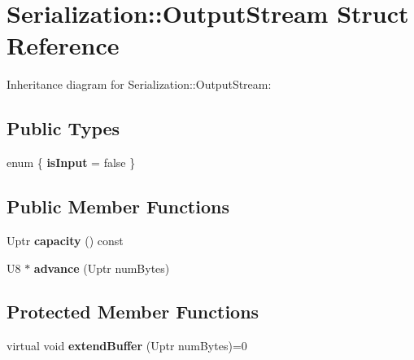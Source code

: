 \hypertarget{struct_serialization_1_1_output_stream}{}\section{Serialization\+:\+:Output\+Stream Struct Reference}
\label{struct_serialization_1_1_output_stream}


Inheritance diagram for Serialization\+:\+:Output\+Stream\+:
\subsection*{Public Types}
\begin{DoxyCompactItemize}
\item 
\mbox{\label{struct_serialization_1_1_output_stream_a17002da4782075f69a99e93811d73e61}} 
enum \{ {\bfseries is\+Input} = false
 \}
\end{DoxyCompactItemize}
\subsection*{Public Member Functions}
\begin{DoxyCompactItemize}
\item 
\mbox{\label{struct_serialization_1_1_output_stream_acbf665b52ca229f30af8ef45fa9c3b8a}} 
Uptr {\bfseries capacity} () const
\item 
\mbox{\label{struct_serialization_1_1_output_stream_a7db4d42c1adba71221eeb5bbd366e489}} 
U8 $\ast$ {\bfseries advance} (Uptr num\+Bytes)
\end{DoxyCompactItemize}
\subsection*{Protected Member Functions}
\begin{DoxyCompactItemize}
\item 
\mbox{\label{struct_serialization_1_1_output_stream_ab50708fb37e9f1f3cb0688e733e50cdd}} 
virtual void {\bfseries extend\+Buffer} (Uptr num\+Bytes)=0
\end{DoxyCompactItemize}
